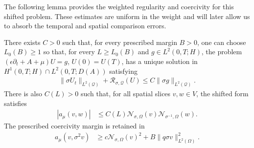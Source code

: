 \documentclass[print,wide,eng]{draft}
\begin{document}
The following lemma provides the weighted regularity and coercivity for this shifted problem. These estimates are uniform in the weight and will later allow us to absorb the temporal and spatial comparison errors.
%
\begin{lemma}\label{lem:graph}
There exists $C>0$ such that, for every prescribed margin $B>0$, one can choose $L_0(B)\geq1$ so that, for every $L\geq L_0(B)$ and $g\in L^2(0,T;H)$, the problem $(\epsilon\partial_t+A+\mu)U=g$, $U(0)=U(T)$, has a unique solution in $H^1(0,T;H)\cap L^2(0,T;D(A))$ satisfying
\begin{align}\label{eq:primitivegraph}
\|\sigma U_t\|_{L^2(\mathcal Q)}+\mathcal R_{\sigma,\mathcal Q}(U)\leq C\|\sigma g\|_{L^2(\mathcal Q)}.
\end{align}
There is also $C(L)>0$ such that, for all spatial slices $v,w\in V$, the shifted form satisfies
\begin{align}
|a_\mu(v,w)|&\leq C(L)\mathcal N_{\sigma,\Omega}(v)\mathcal N_{\sigma^{-1},\Omega}(w).\label{eq:formbound}
\end{align}
The prescribed coercivity margin is retained in
\begin{align}
a_\mu(v,\sigma^2v)&\geq c\mathcal N_{\sigma,\Omega}(v)^2+B\|q\sigma v\|_{L^2(\Omega)}^2.\label{eq:formcoercive}
\end{align}
\end{lemma}
%
\end{document}

